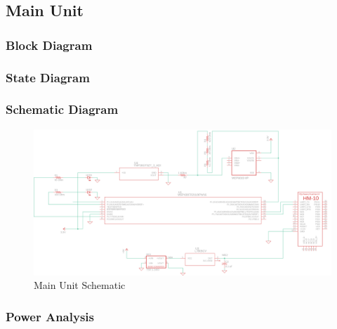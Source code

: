 \subsection{Main Unit}
\subsubsection{Block Diagram}
\subsubsection{State Diagram}

\subsubsection{Schematic Diagram}
\begin{landscape}
  \begin{center}
  \begin{figure}[H]
    \includegraphics[width=1.6\textwidth, left]{../Appendix/Figures/Main-Unit.png}
    \caption{Main Unit Schematic}
    \label{fig:main-schematic}
  \end{figure}
  \end{center}
  \end{landscape}
\subsubsection{Power Analysis}
